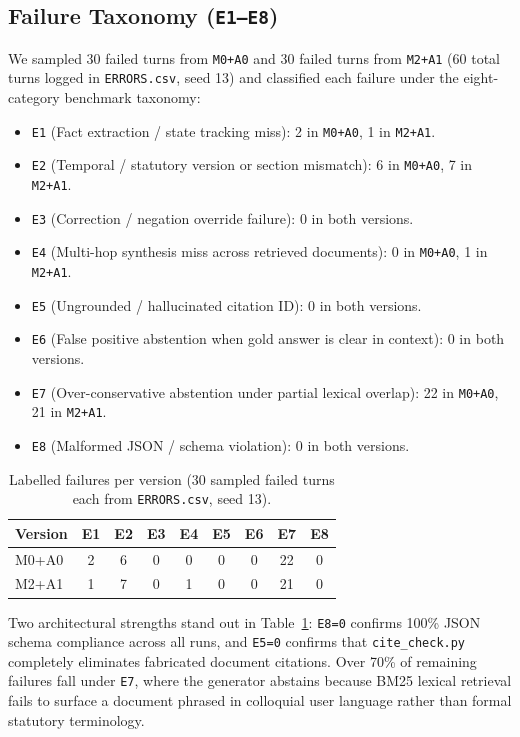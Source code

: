 \documentclass[11pt]{article}
\newcommand{\groupid}{G14}
\begin{document}
\subsection{Failure Taxonomy (\texttt{E1--E8})}
We sampled 30 failed turns from \texttt{M0+A0} and 30 failed turns from \texttt{M2+A1} (60 total turns logged in \texttt{ERRORS.csv}, seed 13) and classified each failure under the eight-category benchmark taxonomy:
\begin{itemize}[leftmargin=*,nosep]
    \item \texttt{E1} (Fact extraction / state tracking miss): 2 in \texttt{M0+A0}, 1 in \texttt{M2+A1}.
    \item \texttt{E2} (Temporal / statutory version or section mismatch): 6 in \texttt{M0+A0}, 7 in \texttt{M2+A1}.
    \item \texttt{E3} (Correction / negation override failure): 0 in both versions.
    \item \texttt{E4} (Multi-hop synthesis miss across retrieved documents): 0 in \texttt{M0+A0}, 1 in \texttt{M2+A1}.
    \item \texttt{E5} (Ungrounded / hallucinated citation ID): 0 in both versions.
    \item \texttt{E6} (False positive abstention when gold answer is clear in context): 0 in both versions.
    \item \texttt{E7} (Over-conservative abstention under partial lexical overlap): 22 in \texttt{M0+A0}, 21 in \texttt{M2+A1}.
    \item \texttt{E8} (Malformed JSON / schema violation): 0 in both versions.
\end{itemize}

\begin{table}[h]
\centering\small
\caption{Labelled failures per version (30 sampled failed turns each from \texttt{ERRORS.csv}, seed 13).}
\label{tab:\groupid-errors}
\begin{tabular}{lcccccccc}
\toprule
Version & E1 & E2 & E3 & E4 & E5 & E6 & E7 & E8 \\
\midrule
M0+A0 & 2 & 6 & 0 & 0 & 0 & 0 & 22 & 0 \\
M2+A1 & 1 & 7 & 0 & 1 & 0 & 0 & 21 & 0 \\
\bottomrule
\end{tabular}
\end{table}

Two architectural strengths stand out in Table~\ref{tab:\groupid-errors}: \texttt{E8=0} confirms 100\% JSON schema compliance across all runs, and \texttt{E5=0} confirms that \texttt{cite\_check.py} completely eliminates fabricated document citations. Over 70\% of remaining failures fall under \texttt{E7}, where the generator abstains because BM25 lexical retrieval fails to surface a document phrased in colloquial user language rather than formal statutory terminology.
\end{document}
